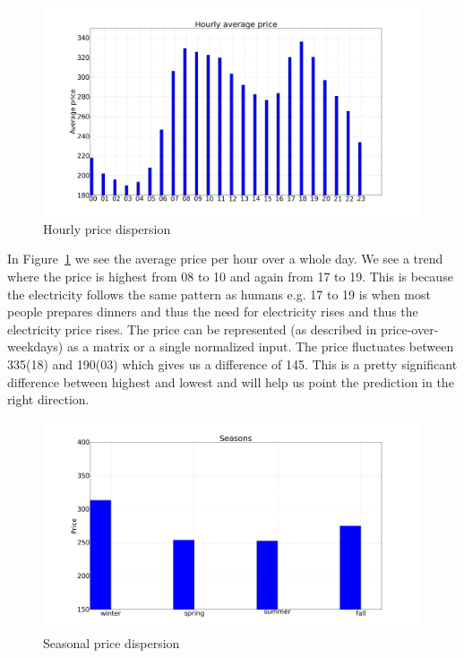 \begin{figure}[H]
\centering
\includegraphics[width=0.99\textwidth ]{billeder/energy_price_plots/price_per_hour.png}
\caption{Hourly price dispersion}
\label{fig:price_per_hour}
\end{figure}

In Figure~\ref{fig:price_per_hour} we see the average price per hour over a whole day. We see a trend where the price is highest from 08 to 10 and again from 17 to 19. This is because the electricity follows the same pattern as humans e.g. 17 to 19 is when most people prepares dinners and thus the need for electricity rises and thus the electricity price rises. The price can be represented (as described in price-over-weekdays) as a matrix or a single normalized input. The price fluctuates between 335(18) and 190(03) which gives us a difference of 145. This is a pretty significant difference between highest and lowest and will help us point the prediction in the right direction.

\begin{figure}[H]
\centering
\includegraphics[width=0.99\textwidth ]{billeder/energy_price_plots/seasons.png}
\caption{Seasonal price dispersion}
\label{fig:seasons}
\end{figure}

